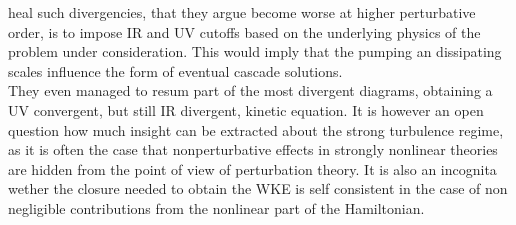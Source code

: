heal such divergencies, that they argue become worse at higher perturbative order, is to impose IR and UV cutoffs based on the underlying physics of the problem
under consideration. This would imply that the pumping an dissipating scales influence the form of eventual cascade solutions. \\
They even managed to resum part of the most divergent diagrams, obtaining a UV convergent, but still IR divergent, kinetic equation. It is however an open question 
how much insight can be extracted about the strong turbulence regime, as it is often the case that nonperturbative effects in strongly nonlinear theories are hidden
from the point of view of perturbation theory. It is also an incognita wether the closure needed to obtain the WKE is self consistent in 
the case of non negligible contributions 
from the nonlinear part of the Hamiltonian. \\

